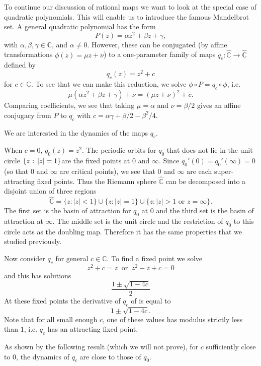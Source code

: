 \documentclass[12pt]{article}
\theoremstyle{definition}
\theoremstyle{remark}
\begin{document}
To continue our discussion of rational maps we want to look at the special case of quadratic polynomials. This will enable us to introduce the famous Mandelbrot set.
A general quadratic polynomial has the form
\[
P(z)= \alpha z^2 + \beta z+ \gamma,
\]
with $\alpha,\beta,\gamma \in \mathbb C$, and $\alpha \ne 0$. However, these can be conjugated
(by affine transformations $\phi(z) = \mu z + \nu$) to a one-parameter family of maps
$q_c: \widehat{\mathbb{C}}  \to \widehat{\mathbb{C}} $ defined by 
\[
q_c(z)= z^2 + c
\] 
for $c \in \mathbb{C}$. 
To see that we can make this reduction, we solve $\phi \circ P = q_c \circ \phi$, i.e.
\[
\mu(\alpha z^2 + \beta z + \gamma) + \nu = (\mu z+\nu)^2 +c.
\]
Comparing coefficients, we see that taking $\mu = \alpha$ and $\nu = \beta/2$ gives an affine 
conjugacy from $P$ to $q_c$ with $c = \alpha \gamma +\beta/2 -\beta^2/4$.

\medskip


We are interested in the dynamics of the maps $q_c$. 

\medskip 

When $c =0$, $q_0(z) = z^2$. The periodic orbits for $q_0$ that does not lie in 
the unit circle $\{z \hbox{ : } |z|=1\}$are the fixed points at $0$ and $\infty$. Since $q_0'(0) = q_0'(\infty)=0$ (so
that $0$ and $\infty$ are critical points), 
we see that $0$ and $\infty$ are each super-attracting fixed points. Thus the 
Riemann sphere $\widehat{\mathbb{C}}$ can be decomposed into a disjoint union of three regions
\[
\widehat{\mathbb{C}} = \{ z : |z| < 1\} \cup \{z: |z| =1 \} \cup \{z : |z|>1 \text{ or } z =\infty \}.
\]
The first set is the basin of attraction for $q_0$ at $0$ and the third set is the basin of attraction at $\infty$. The middle set is the unit circle and the restriction of $q_0$ to this circle acts as the doubling map. Therefore it has the same properties that we studied previously.

\medskip
Now consider $q_c$ for general $c \in \mathbb{C}$. To find a fixed point we solve
\[
z^2 + c = z \ \text{ or } \ z^2 -z + c =0
\]
and this has solutions
\[
  \frac{1 \pm \sqrt{1 - 4c}}{2}
\]
At these fixed points the derivative of $q_c$ of is equal to
\[
1 \pm \sqrt{1-4c}.
\]
 Note that for all small enough $c$, one of these values has modulus strictly less than $1$, i.e. $q_c$ has an attracting fixed point.

As shown by the following result (which we will not prove), for $c$ sufficiently close to $0$, the dynamics of $q_c$ are close to those of $q_0$. 
\end{document}
